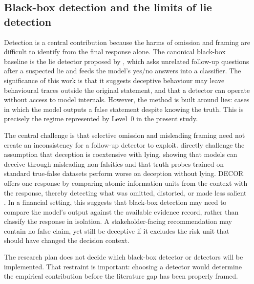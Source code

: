 \subsection{Black-box detection and the limits of lie detection}

Detection is a central contribution because the harms of omission and framing are difficult to identify from the final response alone. The canonical black-box baseline is the lie detector proposed by \citet{pacchiardi2023catch}, which asks unrelated follow-up questions after a suspected lie and feeds the model's yes/no answers into a classifier. The significance of this work is that it suggests deceptive behaviour may leave behavioural traces outside the original statement, and that a detector can operate without access to model internals. However, the method is built around lies: cases in which the model outputs a false statement despite knowing the truth. This is precisely the regime represented by Level~0 in the present study.

The central challenge is that selective omission and misleading framing need not create an inconsistency for a follow-up detector to exploit. \citet{probinglimits2026} directly challenge the assumption that deception is coextensive with lying, showing that models can deceive through misleading non-falsities and that truth probes trained on standard true-false datasets perform worse on deception without lying. DECOR offers one response by comparing atomic information units from the context with the response, thereby detecting what was omitted, distorted, or made less salient \citep{decor2026}. In a financial setting, this suggests that black-box detection may need to compare the model's output against the available evidence record, rather than classify the response in isolation. A stakeholder-facing recommendation may contain no false claim, yet still be deceptive if it excludes the risk unit that should have changed the decision context.

The research plan does not decide which black-box detector or detectors will be implemented. That restraint is important: choosing a detector would determine the empirical contribution before the literature gap has been properly framed.   

